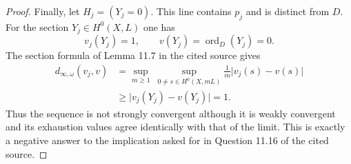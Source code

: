 \begin{proof}
Finally, let \(H_j=(Y_j=0)\).  This line contains \(p_j\) and is distinct
from \(D\).  For the section \(Y_j\in H^0(X,L)\) one has
\[
                   v_j(Y_j)=1,
                   \qquad v(Y_j)=\operatorname{ord}_D(Y_j)=0.
\tag{5}\label{eq:p11-moving-section}
\]
The section formula of Lemma 11.7 in the cited source gives
\[
\begin{aligned}
 d_{\infty,\omega}(v_j,v)
 &=\sup_{m\geq1}\ \sup_{0\ne s\in H^0(X,mL)}
       \frac{1}{m}\lvert v_j(s)-v(s)\rvert \\
 &\geq \lvert v_j(Y_j)-v(Y_j)\rvert=1.
\end{aligned}
\tag{6}\label{eq:p11-strong-gap}
\]
Thus the sequence is not strongly convergent although it is weakly
convergent and its exhaustion values agree identically with that of the
limit.  This is exactly a negative answer to the implication asked for in
Question 11.16 of the cited source.
\end{proof}
